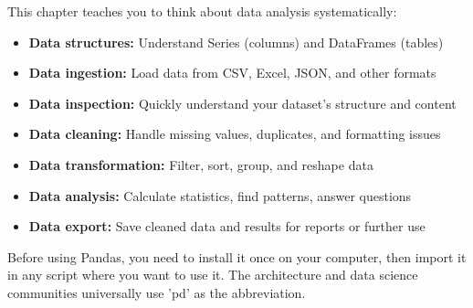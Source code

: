 \begin{tcolorbox}[title=Focus of this chapter:,colframe=orange,colback=white,arc=2mm]
This chapter teaches you to think about data analysis systematically:
\begin{itemize}
\item \textbf{Data structures:} Understand Series (columns) and DataFrames (tables)
\item \textbf{Data ingestion:} Load data from CSV, Excel, JSON, and other formats
\item \textbf{Data inspection:} Quickly understand your dataset's structure and content
\item \textbf{Data cleaning:} Handle missing values, duplicates, and formatting issues
\item \textbf{Data transformation:} Filter, sort, group, and reshape data
\item \textbf{Data analysis:} Calculate statistics, find patterns, answer questions
\item \textbf{Data export:} Save cleaned data and results for reports or further use
\end{itemize}
\end{tcolorbox}



Before using Pandas, you need to install it once on your computer, then import it in any script where you want to use it. The architecture and data science communities universally use 'pd' as the abbreviation.



